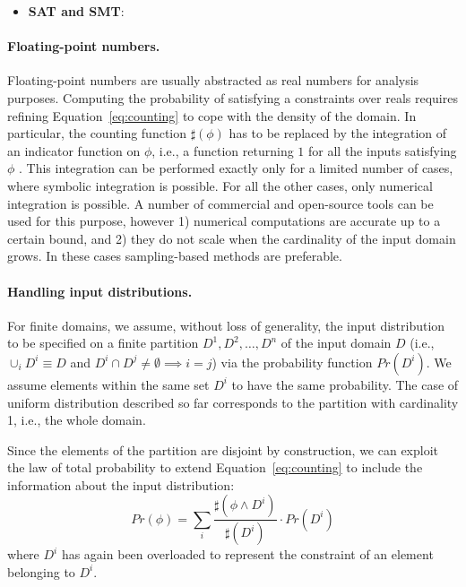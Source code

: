 \begin{itemize}
	\item \textbf{SAT and SMT}: 

\end{itemize}


\paragraph{Floating-point numbers.} 
Floating-point numbers are usually abstracted as real numbers for analysis purposes. Computing the probability of satisfying a constraints over reals requires refining Equation~\ref{eq:counting} to cope with the density of the domain. In particular, the counting function $\sharp(\phi)$ has to be replaced by the integration of an indicator function on $\phi$, i.e., a function returning $1$ for all the inputs satisfying $\phi$ \cite{Borges2014}. This integration can be performed exactly only for a limited number of cases, where symbolic integration is possible. For all the other cases, only numerical integration is possible. A number of commercial and open-source tools can be used for this purpose, however 1) numerical computations are accurate up to a certain bound, and 2) they do not scale when the cardinality of the input domain grows. In these cases sampling-based methods are preferable. 

\paragraph{Handling input distributions.} 
For finite domains, we assume, without loss of generality, the input distribution to be specified on a finite partition $D^1, D^2, \dots, D^n$ of the input domain $D$ (i.e., $\cup_i D^i \equiv D$ and $D^i \cap D^j \neq \emptyset \implies i=j$) via the probability function $Pr(D^i)$. We assume elements within the same set $D^i$ to have the same probability. The case of uniform distribution described so far corresponds to the partition with cardinality 1, i.e., the whole domain.
 
Since the elements of the partition are disjoint by construction, we can exploit the law of total probability to extend Equation~\eqref{eq:counting} to include the information about the input distribution:
%
\begin{equation}\label{eq:countingInputDistribution}
	Pr(\phi) = \sum_i \frac{\sharp(\phi \land D^i)}{\sharp(D^i)} \cdot Pr(D^i)
\end{equation}
%
\noindent where $D^i$ has again been overloaded to represent the constraint of an element belonging to $D^i$.

